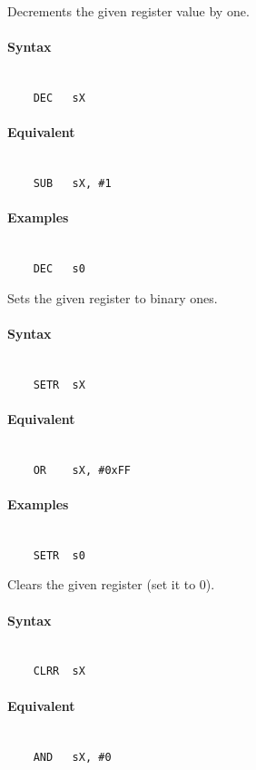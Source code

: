     Decrements the given register value by one.

    \paragraph{Syntax}
        ~\\
        \verb'    DEC   sX'

    \paragraph{Equivalent}
        ~\\
        \verb'    SUB   sX, #1'

    \paragraph{Examples}
        ~\\
        \verb'    DEC   s0'

    Sets the given register to binary ones.

    \paragraph{Syntax}
        ~\\
        \verb'    SETR  sX'

    \paragraph{Equivalent}
        ~\\
        \verb'    OR    sX, #0xFF'

    \paragraph{Examples}
        ~\\
        \verb'    SETR  s0'

    Clears the given register (set it to 0).

    \paragraph{Syntax}
        ~\\
        \verb'    CLRR  sX'

    \paragraph{Equivalent}
        ~\\
        \verb'    AND   sX, #0'

